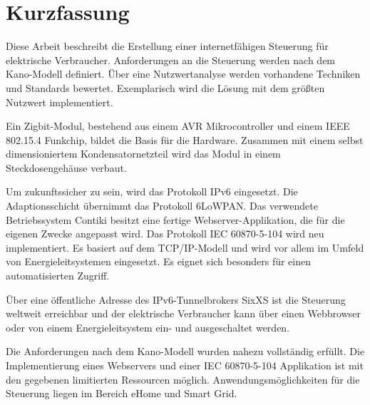

\section*{Kurzfassung}

Diese Arbeit beschreibt die Erstellung einer internetfähigen Steuerung für elektrische Verbraucher. Anforderungen an die Steuerung werden nach dem Kano-Modell definiert. Über eine Nutzwertanalyse werden vorhandene Techniken und Standards bewertet. Exemplarisch wird die Lösung mit dem größten Nutzwert implementiert.

Ein Zigbit-Modul, bestehend aus einem AVR Mikrocontroller und einem IEEE 802.15.4 Funkchip, bildet die Basis für die Hardware. Zusammen mit einem selbst dimensioniertem Kondensatornetzteil wird das Modul in einem Steckdosengehäuse verbaut.

Um zukunftssicher zu sein, wird das Protokoll IPv6 eingesetzt. Die Adaptionsschicht übernimmt das Protokoll 6LoWPAN. Das verwendete Betriebssystem Contiki besitzt eine fertige Webserver-Applikation, die für die eigenen Zwecke angepasst wird. Das Protokoll IEC 60870-5-104 wird neu implementiert. Es basiert auf dem TCP/IP-Modell und wird vor allem im Umfeld von Energieleitsystemen eingesetzt. Es eignet sich besonders für einen automatisierten Zugriff.

Über eine öffentliche Adresse des IPv6-Tunnelbrokers SixXS ist die Steuerung weltweit erreichbar und der elektrische Verbraucher kann über einen Webbrowser oder von einem Energieleitsystem ein- und ausgeschaltet werden.

Die Anforderungen nach dem Kano-Modell wurden nahezu vollständig erfüllt. Die Implementierung eines Webservers und einer IEC 60870-5-104 Applikation ist mit den gegebenen limitierten Ressourcen möglich. Anwendungsmöglichkeiten für die Steuerung liegen im Bereich eHome und Smart Grid.


